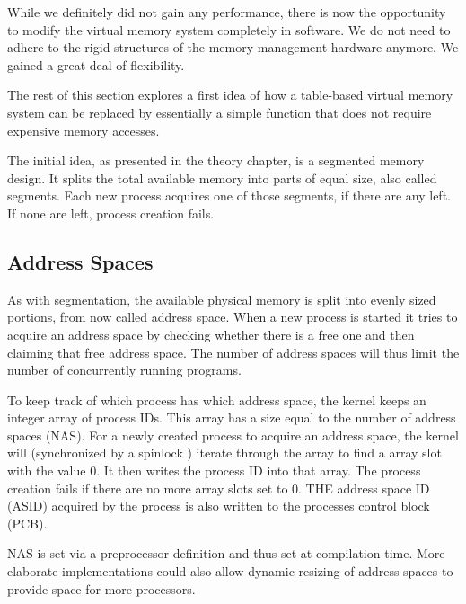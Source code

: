 While we definitely did not gain any performance, there is now the opportunity to modify the virtual memory system
completely in software. We do not need to adhere to the rigid structures \cite{tanenbaumOS} of the memory management hardware anymore.
We gained a great deal of flexibility.

The rest of this section explores a first idea of how a table-based virtual memory system can be
replaced by essentially a simple function that does not require expensive memory accesses.

The initial idea, as presented in the theory chapter, is a segmented memory design. It splits the total
available memory into parts of equal size, also called segments.
Each new process acquires one of those segments, if there are any left. If none are left, process creation fails.

\subsection{Address Spaces}
As with segmentation, the available physical memory is split into evenly sized portions,
from now called address space. When a new process is started it tries to acquire an address space by
checking whether there is a free one and then claiming that free address space.
The number of address spaces will thus limit the number of concurrently running programs.

To keep track of which process has which address space, the kernel keeps an integer array of process IDs.
This array has a size equal to the number of address spaces (NAS).
For a newly created process to acquire an address space, the kernel will (synchronized by a spinlock \cite{cox2011xv6})
iterate through the array to find a array slot with the value 0. It then writes the process ID into that array.
The process creation fails if there are no more array slots set to 0.
THE address space ID (ASID) acquired by the process is also written to the processes control block (PCB).

NAS is set via a preprocessor definition and thus set at compilation time. More elaborate implementations
could also allow dynamic resizing of address spaces to provide space for more processors.

